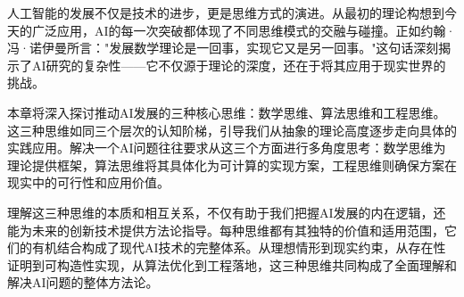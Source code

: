 人工智能的发展不仅是技术的进步，更是思维方式的演进。从最初的理论构想到今天的广泛应用，AI的每一次突破都体现了不同思维模式的交融与碰撞。正如约翰·冯·诺伊曼所言："发展数学理论是一回事，实现它又是另一回事。"这句话深刻揭示了AI研究的复杂性——它不仅源于理论的深度，还在于将其应用于现实世界的挑战。

本章将深入探讨推动AI发展的三种核心思维：数学思维、算法思维和工程思维。这三种思维如同三个层次的认知阶梯，引导我们从抽象的理论高度逐步走向具体的实践应用。解决一个AI问题往往要求从这三个方面进行多角度思考：数学思维为理论提供框架，算法思维将其具体化为可计算的实现方案，工程思维则确保方案在现实中的可行性和应用价值。

理解这三种思维的本质和相互关系，不仅有助于我们把握AI发展的内在逻辑，还能为未来的创新技术提供方法论指导。每种思维都有其独特的价值和适用范围，它们的有机结合构成了现代AI技术的完整体系。从理想情形到现实约束，从存在性证明到可构造性实现，从算法优化到工程落地，这三种思维共同构成了全面理解和解决AI问题的整体方法论。
